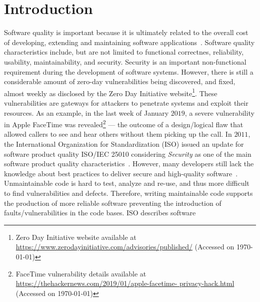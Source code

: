 \documentclass[sigconf,review]{acmart}
\begin{document}



\maketitle


\section{Introduction}
%
Software quality is important because it is ultimately related to the overall
cost of developing, extending and maintaining software applications~\cite{slaughter1998evaluating}. 
Software quality characteristics include, but are not limited to functional correctnes,
reliability, usability, maintainability, and security. Security is an 
important non-functional requirement during the development of software systems. 
However, there is still a considerable amount of zero-day vulnerabilities being
discovered, and fixed, almost weekly as disclosed by the Zero Day Initiative
website\footnote{Zero Day Initiative website available at
\url{https://www.zerodayinitiative.com/advisories/published/} (Accessed on \today{})}.
These vulnerabilities are gateways for attackers to penetrate systems and 
exploit their resources. As an example, in the last week of January $2019$, 
a severe vulnerability in Apple FaceTime was revealed\footnote{FaceTime vulnerability 
details available at \url{https://thehackernews.com/2019/01/apple-facetime-
privacy-hack.html} (Accessed on \today{})} --- the outcome of a design/logical
flaw that allowed callers to see and hear others without them picking up the call.
%
In $2011$, the International Organization for Standardization (ISO) issued an
update for software product quality ISO/IEC 25010 considering
\emph{Security} as one of the main software product quality characteristics~\cite{iso:2011}. 
However, many developers still lack the knowledge about best practices to deliver secure and high-quality software~\cite{Pothamsetty:2005:SEL:1107622.1107635, 8077802}.
Unmaintainable code is hard to test, analyze and re-use, and thus more difficult
to find vulnerabilities and defects. Therefore, writing maintainable code
supports the production of more reliable software preventing the introduction of 
faults/vulnerabilities in the code bases. ISO describes software 
\end{document}
